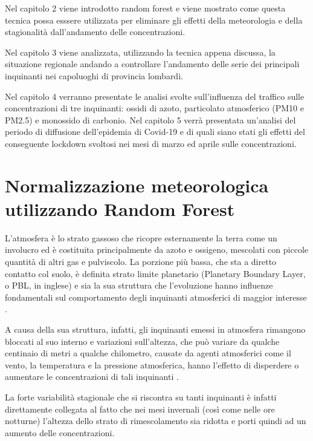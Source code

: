 \documentclass[a4paper,12pt]{report}
\begin{document}
Nel capitolo 2 viene introdotto random forest e viene mostrato come questa tecnica possa esssere utilizzata per eliminare gli effetti della meteorologia e della stagionalità dall'andamento delle concentrazioni.  

Nel capitolo 3 viene analizzata, utilizzando la tecnica appena discussa, la situazione regionale andando a controllare l'andamento delle serie dei principali inquinanti nei capoluoghi di provincia lombardi.  

Nel capitolo 4 verranno presentate le analisi svolte sull'influenza del traffico sulle concentrazioni di tre inquinanti: ossidi di azoto, particolato atmosferico (PM10 e PM2.5) e monossido di carbonio.
Nel capitolo 5 verrà presentata un'analisi del periodo di diffusione dell'epidemia di Covid-19 e di quali siano stati gli effetti del conseguente lockdown svoltosi nei mesi di marzo ed aprile sulle concentrazioni.

\chapter{Normalizzazione meteorologica utilizzando Random Forest}
L'atmosfera è lo strato gassoso che ricopre esternamente la terra come un involucro ed è costituita principalmente da azoto e ossigeno, mescolati con piccole quantità di altri gas e pulviscolo. La porzione più bassa, che sta a diretto contatto col suolo, è definita strato limite planetario (Planetary Boundary Layer, o PBL, in inglese) e sia la sua struttura che l'evoluzione hanno influenze fondamentali sul comportamento degli inquinanti atmosferici di maggior interesse \cite{dina2009concentrazione}.  

A causa della sua struttura, infatti, gli inquinanti emessi in atmosfera rimangono bloccati al suo interno e variazioni sull'altezza, che può variare da qualche centinaio di metri a qualche chilometro, causate da agenti atmosferici come il vento, la temperatura e la pressione atmosferica, hanno l'effetto di disperdere o aumentare le concentrazioni di tali inquinanti \cite{stull2012introduction}.  

La forte variabilità stagionale che si riscontra su tanti inquinanti è infatti direttamente collegata al fatto che nei mesi invernali (così come nelle ore notturne) l'altezza dello strato di rimescolamento sia ridotta e porti quindi ad un aumento delle concentrazioni.  
\end{document}
